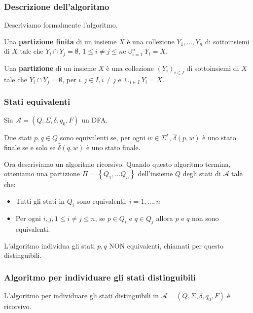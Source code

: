 \subsubsection{Descrizione dell'algoritmo}

Descriviamo formalmente l'algoritmo.

Una \textbf{partizione finita} di un insieme $X$ è una collezione $Y_{1}, \ldots, Y_{n}$ di sottoinsiemi di $X$ tale che $Y_{i} \cap Y_{j}=\emptyset$, $1 \leq i \neq j \leq n \mathrm{e} \cup_{i=1}^{n} Y_{i}=X$.

Una \textbf{partizione} di un insieme $X$ è una collezione $\left(Y_{i}\right)_{i \in I}$ di sottoinsiemi di $X$ tale che $Y_{i} \cap Y_{j}=\emptyset$, per $i, j \in I, i \neq j$ e $\cup_{i \in I} Y_{i}=X$.

\subsubsection{Stati equivalenti}

Sia $\mathcal{A}=\left(Q, \Sigma, \delta, q_{0}, F\right)$ un DFA.

Due stati $p, q \in Q$ sono equivalenti se, per ogni $w \in \Sigma^{*}$, $\hat{\delta}(p, w)$ è uno stato finale se e solo se $\hat{\delta}(q, w)$ è uno stato finale.

\vspace{5mm}

Ora descriviamo un algoritmo ricorsivo. Quando questo algoritmo termina, otteniamo una partizione $\Pi=\left\{Q_{1}, \ldots Q_{n}\right\}$ dell'insieme $Q$ degli stati di $\mathcal{A}$ tale che:
\begin{itemize}
    \item Tutti gli stati in $Q_{i}$ sono equivalenti, $i=1, \ldots, n$
    \item Per ogni $i, j, 1 \leq i \neq j \leq n$, se $p \in Q_{i}$ e $q \in Q_{j}$ allora $p$ e $q$ non sono equivalenti.
\end{itemize}
L'algoritmo individua gli stati $p, q$ NON equivalenti, chiamati per questo distinguibili.

\subsubsection{Algoritmo per individuare gli stati distinguibili}
L'algoritmo per individuare gli stati distinguibili in $\mathcal{A}=\left(Q, \Sigma, \delta, q_{0}, F\right)$ è ricorsivo.

\vspace{5mm}

